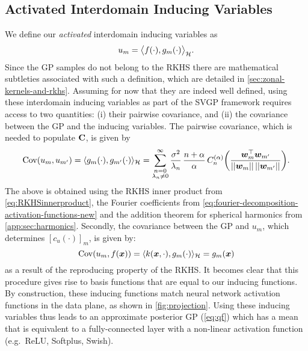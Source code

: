 



\subsection{Activated Interdomain Inducing Variables}
\label{sec:relu-inducing-variables}

We define our \emph{activated} interdomain inducing variables as
\begin{equation}
\label{eq:def-inducing-variable}
    u_m = \big\langle f(\cdot), {g}_m(\cdot) \big\rangle_{{\mathcal{H}}}.
\end{equation}
Since the GP samples do not belong to the RKHS there are mathematical subtleties associated with such a definition, which are detailed in \cref{sec:zonal-kernels-and-rkhs}. Assuming for now that they are indeed well defined, using these interdomain inducing variables as part of the SVGP framework requires access to two quantities: (i) their pairwise covariance, and (ii) the covariance between the GP and the inducing variables. The pairwise covariance, which is needed to populate $\mathbf{{C}}$, is given by
\begin{equation}
\label{eq:kuu}
\Cov(u_{m}, u_{m'})
= \langle {g}_m(\cdot), {g}_{m'}(\cdot) \rangle_\rkhs
= \sum_{\substack{n=0 \\ \lambda_n \neq 0}}^{\infty}
    \frac{\sigma^2}{\lambda_n}\,\frac{n + \alpha}{\alpha}\,C_n^{(\alpha)}\left(\frac{\vw_m^\top \vw_{m'}}{\norm{\vw_m}\,\norm{\vw_{m'}}}\right).  
\end{equation}
The above is obtained using the RKHS inner product from \cref{eq:RKHSinnerproduct}, the Fourier coefficients from \cref{eq:fourier-decomposition-activation-functions-new} and the addition theorem for spherical harmonics from \cref{app:sec:harmonics}. Secondly, the covariance between the GP and $u_m$, which determines $[c_u(\cdot)]_m$, is given by:
\begin{equation}
\label{eq:kuf}
  \mathrm{Cov}(u_m, f(\bm{x})) = 
    \langle k(\bm{x}, \cdot), {g}_m(\cdot) \rangle_{{\mathcal{H}}} = {g}_m(\bm{x}) 
\end{equation}
as a result of the reproducing property of the RKHS. It becomes clear that this procedure gives rise to basis functions that are equal to our inducing functions. By construction, these inducing functions match neural network activation functions in the data plane, as shown in \cref{fig:projection}. Using these inducing variables thus leads to an approximate posterior GP (\cref{eq:qf}) which has a mean that is equivalent to a fully-connected layer with a non-linear activation function (e.g.~ReLU, Softplus, Swish). 


